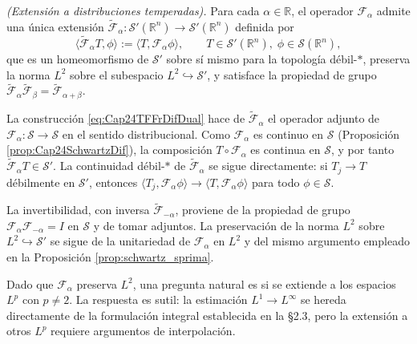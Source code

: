             \begin{proposition}\label{prop:Cap24SprimaDif}
                \textit{(Extensión a distribuciones temperadas).} Para cada $\alpha \in \mathbb{R}$, el operador $\mathcal{F}_\alpha$ admite una única extensión $\tilde{\mathcal{F}}_\alpha: \mathcal{S}'(\mathbb{R}^n) \to \mathcal{S}'(\mathbb{R}^n)$ definida por
                \begin{equation}\label{eq:Cap24TFFrDifDual}
                    \langle \tilde{\mathcal{F}}_\alpha T, \phi\rangle := \langle T, \mathcal{F}_\alpha\phi\rangle, \qquad T\in \mathcal{S}'(\mathbb{R}^n),\; \phi\in \mathcal{S}(\mathbb{R}^n),
                \end{equation}
                que es un homeomorfismo de $\mathcal{S}'$ sobre sí mismo para la topología débil-$*$, preserva la norma $L^2$ sobre el subespacio $L^2 \hookrightarrow \mathcal{S}'$, y satisface la propiedad de grupo $\tilde{\mathcal{F}}_\alpha \tilde{\mathcal{F}}_\beta = \tilde{\mathcal{F}}_{\alpha+\beta}$.
            \end{proposition}
            \begin{Proof}
                La construcción \eqref{eq:Cap24TFFrDifDual} hace de $\tilde{\mathcal{F}}_\alpha$ el operador adjunto de $\mathcal{F}_\alpha: \mathcal{S}\to \mathcal{S}$ en el sentido distribucional. Como $\mathcal{F}_\alpha$ es continuo en $\mathcal{S}$ (Proposición \ref{prop:Cap24SchwartzDif}), la composición $T\circ \mathcal{F}_\alpha$ es continua en $\mathcal{S}$, y por tanto $\tilde{\mathcal{F}}_\alpha T \in \mathcal{S}'$. La continuidad débil-$*$ de $\tilde{\mathcal{F}}_\alpha$ se sigue directamente: si $T_j \to T$ débilmente en $\mathcal{S}'$, entonces $\langle T_j, \mathcal{F}_\alpha\phi\rangle \to \langle T, \mathcal{F}_\alpha\phi\rangle$ para todo $\phi\in\mathcal{S}$.

                La invertibilidad, con inversa $\tilde{\mathcal{F}}_{-\alpha}$, proviene de la propiedad de grupo $\mathcal{F}_\alpha \mathcal{F}_{-\alpha} = I$ en $\mathcal{S}$ y de tomar adjuntos. La preservación de la norma $L^2$ sobre $L^2 \hookrightarrow \mathcal{S}'$ se sigue de la unitariedad de $\mathcal{F}_\alpha$ en $L^2$ y del mismo argumento empleado en la Proposición \ref{prop:schwartz_sprima}.
            \end{Proof}


            Dado que $\mathcal{F}_\alpha$ preserva $L^2$, una pregunta natural es si se extiende a los espacios $L^p$ con $p\neq 2$. La respuesta es sutil: la estimación $L^1\to L^\infty$ se hereda directamente de la formulación integral establecida en la §2.3, pero la extensión a otros $L^p$ requiere argumentos de interpolación.

